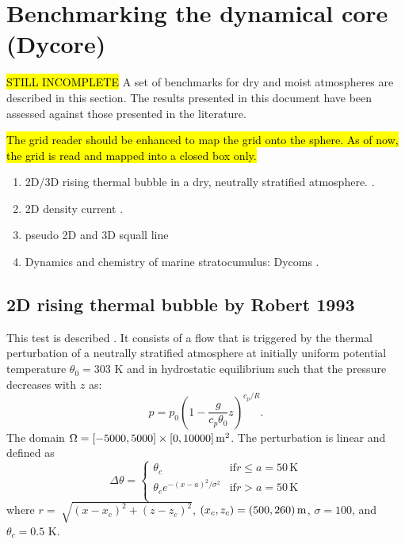 \documentclass{article}
\begin{document}
\section{Benchmarking the dynamical core (Dycore)}
\hl{STILL INCOMPLETE}
A set of benchmarks for dry and moist atmospheres are described in this section. The results presented in this document have been assessed against those presented in the literature. 

\hl{The grid reader should be enhanced to map the grid onto the sphere. As of now, the grid is read and mapped into a closed box only.}


\begin{enumerate}
        \item 2D/3D rising thermal bubble in a dry, neutrally stratified atmosphere. \citep{robert1993}.
        \item 2D density current \citep{strakaWilhelmson1993}.
        \item pseudo 2D and 3D squall line \citep{gabersekGiraldoDoyle2012}
        \item Dynamics and chemistry of marine stratocumulus: Dycoms \citep{Stevens05a}.
\end{enumerate}

\subsection{2D rising thermal bubble by Robert 1993}
\label{2dRTBtest}
This test is described \cite{robert1993}. It consists of a flow that is triggered by the thermal perturbation of a neutrally stratified atmosphere at initially uniform potential temperature $\theta_0 = 303$ K
and in hydrostatic equilibrium such that the pressure decreases with $z$ as:
\begin{equation}
\label{pressureDistrib}
p = p_{0}\left(1-\frac{g}{c_p{\theta_{0}}}z\right)^{c_p/R}.
\end{equation}
The domain $\Omega=[-5000,5000]\times[0,10000]\,{\rm m}^2$.
The perturbation is linear and defined as
\begin{equation}
 \Delta\theta = \left\{ \begin{array}{ll}
 \theta_c & \mathrm{if } r \leq a=50\,{\mathrm K}\\
 \theta_c e^{-(x - a)^2/\sigma^2} & \mathrm{if } r > a=50\,{\mathrm K}\\
\end{array} \right.
\label{eq:robertIni}
\end{equation}
where $r = \sqrt[]{(x-x_{c})^{2} + (z-z_{c})^{2}}$, $(x_c,z_c) = (500,260)\,{\rm m}$, $\sigma = 100$, and $\theta_c=0.5$ K.
\end{document}
